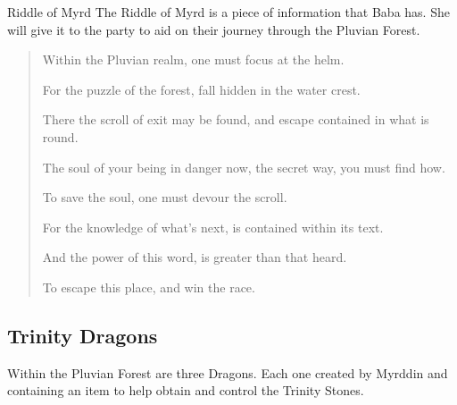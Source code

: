 \begin{commentbox}{Riddle of Myrd}
	The Riddle of Myrd is a piece of information that Baba has. She will give it to the party to aid on their journey through the Pluvian Forest.
	\begin{quote}
		Within the Pluvian realm, one must focus at the helm.
		
		For the puzzle of the forest, fall hidden in the water crest.
		
		There the scroll of exit may be found, and escape contained in what is round.
		
		The soul of your being in danger now, the secret way, you must find how.
		
		To save the soul, one must devour the scroll.
		
		For the knowledge of what's next, is contained within its text.
		
		And the power of this word, is greater than that heard.
		
		To escape this place, and win the race.
	\end{quote}
\end{commentbox}


\subsection{Trinity Dragons}

Within the Pluvian Forest are three Dragons. Each one created by Myrddin and containing an item to help obtain and control the Trinity Stones. 

